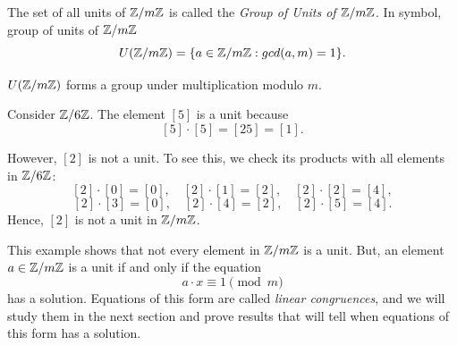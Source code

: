 \begin{definition}
    The set of all units of $\mathbb{Z}/m\mathbb{Z}$ is called the \textit{Group of Units of $\mathbb{Z}/m\mathbb{Z}$}. In symbol, group of units of $\mathbb{Z}/m\mathbb{Z}$
    \[U(\mathbb{Z}/m\mathbb{Z}) = \{a \in \mathbb{Z}/m\mathbb{Z}: gcd(a,m)=1\}.\]
\end{definition}
\begin{lemma}
    $U(\mathbb{Z}/m\mathbb{Z})$ forms a group under multiplication modulo $m$.
\end{lemma}
\begin{eg}  
Consider $ \mathbb{Z}/6\mathbb{Z} $.  
    The element $[5]$ is a unit because  
    \[
    [5] \cdot [5] = [25] = [1].
    \]  

    However, $[2]$ is not a unit. To see this, we check its products with all elements in $ \mathbb{Z}/6\mathbb{Z} $:  
    \[
    [2] \cdot [0] = [0], \quad [2] \cdot [1] = [2], \quad [2] \cdot [2] = [4],
    \]
    \[
    [2] \cdot [3] = [0], \quad [2] \cdot [4] = [2], \quad [2] \cdot [5] = [4].
    \]  
    Hence, $[2]$ is not a unit in $ \mathbb{Z}/m\mathbb{Z} $.  
\end{eg}  

This example shows that not every element in $ \mathbb{Z}/m\mathbb{Z} $ is a unit. But, an element $ a \in \mathbb{Z}/m\mathbb{Z} $ is a unit if and only if the equation  
\[
a \cdot x \equiv 1 \pmod{m}
\]  
has a solution. Equations of this form are called \textit{linear congruences}, and we will study them in the next section and prove results that will tell when equations of this form has a solution.